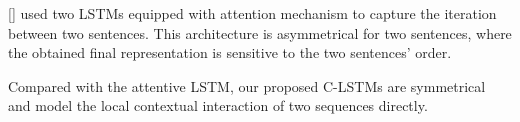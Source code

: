 \documentclass{article}
\newcommand\newcite[1]{\citeauthor{#1} [\citeyear{#1}]}
\begin{document}
\newcite{rocktaschel2015reasoning} used two LSTMs equipped with attention mechanism to capture the iteration between two sentences. This architecture is asymmetrical for two sentences, where the obtained final representation is sensitive to the two sentences' order.

Compared with the attentive LSTM, our proposed C-LSTMs are symmetrical and model the local contextual interaction of two sequences directly.



%
%


\end{document}
